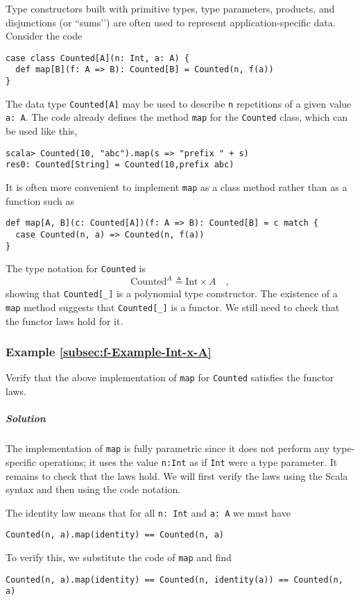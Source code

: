 Type constructors built with primitive types,
type parameters, products, and disjunctions (or \textsf{``}sums\textsf{'}') are often
used to represent application-specific data. Consider the code
\begin{lstlisting}
case class Counted[A](n: Int, a: A) {
  def map[B](f: A => B): Counted[B] = Counted(n, f(a))
}
\end{lstlisting}
The data type \lstinline!Counted[A]! may be used to describe \lstinline!n!
repetitions of a given value \lstinline!a: A!. The code already defines
the  method \lstinline!map! for the \lstinline!Counted! class, which
can be used like this,
\begin{lstlisting}
scala> Counted(10, "abc").map(s => "prefix " + s)
res0: Counted[String] = Counted(10,prefix abc) 
\end{lstlisting}
It is often more convenient to implement \lstinline!map! as a class
method rather than as a function such as
\begin{lstlisting}
def map[A, B](c: Counted[A])(f: A => B): Counted[B] = c match {
  case Counted(n, a) => Counted(n, f(a))
}
\end{lstlisting}

The type notation for \lstinline!Counted! is
\[
\text{Counted}^{A}\triangleq\text{Int}\times A\quad,
\]
showing that \lstinline!Counted[_]! is a polynomial
type constructor. The existence of a \lstinline!map! method suggests
that \lstinline!Counted[_]! is a functor. We still need to check
that the functor laws hold for it.

\subsubsection{Example \label{subsec:f-Example-Int-x-A}\ref{subsec:f-Example-Int-x-A}}

Verify that the above implementation of \lstinline!map! for \lstinline!Counted!
satisfies the functor laws. 

\subparagraph{Solution}

The implementation of \lstinline!map! is fully parametric since it
does not perform any type-specific operations; it uses the value \lstinline!n:Int!
as if \lstinline!Int! were a type parameter. It remains to check
that the laws hold. We will first verify the laws using the Scala
syntax and then using the code notation.

The identity law means that for all \lstinline!n: Int! and \lstinline!a: A!
we must have
\begin{lstlisting}
Counted(n, a).map(identity) == Counted(n, a)
\end{lstlisting}
To verify this, we substitute the code of \lstinline!map! and find
\begin{lstlisting}
Counted(n, a).map(identity) == Counted(n, identity(a)) == Counted(n, a)
\end{lstlisting}

